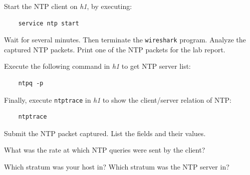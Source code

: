\documentclass{UTNetLab}
\begin{document}
    Start the NTP client on \textit{h1}, by executing:
    
    \begin{lstlisting}
	service ntp start
    \end{lstlisting}
    
    Wait for several minutes. Then terminate the \lstinline{wireshark} program. Analyze the captured NTP packets. Print one of the NTP packets for the lab report.

    Execute the following command in \textit{h1} to get NTP server list: 
    
    \begin{lstlisting}
    ntpq -p
    \end{lstlisting}

    Finally, execute \lstinline{ntptrace} in \textit{h1} to show the client/server relation of NTP:
    
    \begin{lstlisting}
    ntptrace
    \end{lstlisting}
    

    \begin{report}
    \item Submit the NTP packet captured. List the fields and their values.
    
    \item What was the rate at which NTP queries were sent by the client?
    
    \item Which stratum was your host in? Which stratum was the NTP server in?
    \end{report}
\end{document}
